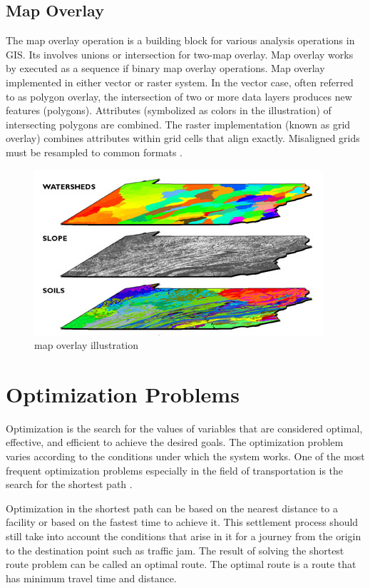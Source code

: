 \pagebreak
\subsection{Map Overlay}
The map overlay operation is a building block for various analysis operations in GIS. Its involves unions or intersection for two-map overlay. Map overlay works by executed as a sequence if binary map overlay operations. Map overlay implemented in either vector or raster system. In the vector case, often referred to as polygon overlay, the intersection of two or more data layers produces new features (polygons). Attributes (symbolized as colors in the illustration) of intersecting polygons are combined. The raster implementation (known as grid overlay) combines attributes within grid cells that align exactly. Misaligned grids must be resampled to common formats \cite{jampani2004}.

\begin{figure}[H]
    \centering
    \includegraphics[scale=0.8]{map_overlay.png}
    \caption{map overlay illustration}
    \label{fig:gis}
\end{figure}


\section{Optimization Problems}
Optimization is the search for the values of variables that are considered optimal, effective, and efficient to achieve the desired goals. The optimization problem varies according to the conditions under which the system works. One of the most frequent optimization problems especially in the field of transportation is the search for the shortest path \cite{hannawati2002}.

Optimization in the shortest path can be based on the nearest distance to a facility or based on the fastest time to achieve it. This settlement process should still take into account the conditions that arise in it for a journey from the origin to the destination point such as traffic jam. The result of solving the shortest route problem can be called an optimal route. The optimal route is a route that has minimum travel time and distance.

